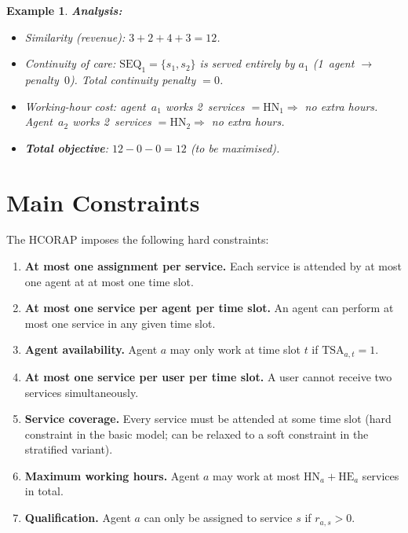 \documentclass[11pt,a4paper]{article}
\newcommand{\SEQ}{\mathrm{SEQ}}
\newcommand{\TSA}{\mathrm{TSA}}
\newcommand{\HN}{\mathrm{HN}}
\newcommand{\HE}{\mathrm{HE}}
\newtheorem{example}{Example}
\begin{document}
\begin{example}
\textbf{Analysis:}
\begin{itemize}
    \item \emph{Similarity (revenue):} $3 + 2 + 4 + 3 = 12$.
    \item \emph{Continuity of care:} $\SEQ_1 = \{s_1,s_2\}$ is served entirely by
          $a_1$ (1~agent $\to$ penalty~$0$). Total continuity penalty $= 0$.
    \item \emph{Working-hour cost:} agent~$a_1$ works 2~services
          $= \HN_1 \Rightarrow$ no extra hours.
          Agent~$a_2$ works 2~services $= \HN_2 \Rightarrow$ no extra hours.
    \item \textbf{Total objective}: $12 - 0 - 0 = 12$ (to be maximised).
\end{itemize}
\end{example}


\section{Main Constraints}\label{sec:constraints}

The HCORAP imposes the following hard constraints:

\begin{enumerate}[label=\textbf{C\arabic*.}]
    \item \label{c:amo-service}
    \textbf{At most one assignment per service.}
    Each service is attended by at most one agent at at most one time slot.

    \item \label{c:amo-agent-ts}
    \textbf{At most one service per agent per time slot.}
    An agent can perform at most one service in any given time slot.

    \item \label{c:agent-availability}
    \textbf{Agent availability.}
    Agent $a$ may only work at time slot $t$ if $\TSA_{a,t} = 1$.

    \item \label{c:amo-user-ts}
    \textbf{At most one service per user per time slot.}
    A user cannot receive two services simultaneously.

    \item \label{c:service-coverage}
    \textbf{Service coverage.}
    Every service must be attended at some time slot (hard constraint in the
    basic model; can be relaxed to a soft constraint in the stratified variant).

    \item \label{c:max-hours}
    \textbf{Maximum working hours.}
    Agent $a$ may work at most $\HN_a + \HE_a$ services in total.

    \item \label{c:qualification}
    \textbf{Qualification.}
    Agent $a$ can only be assigned to service $s$ if $r_{a,s} > 0$.
\end{enumerate}
\end{document}
